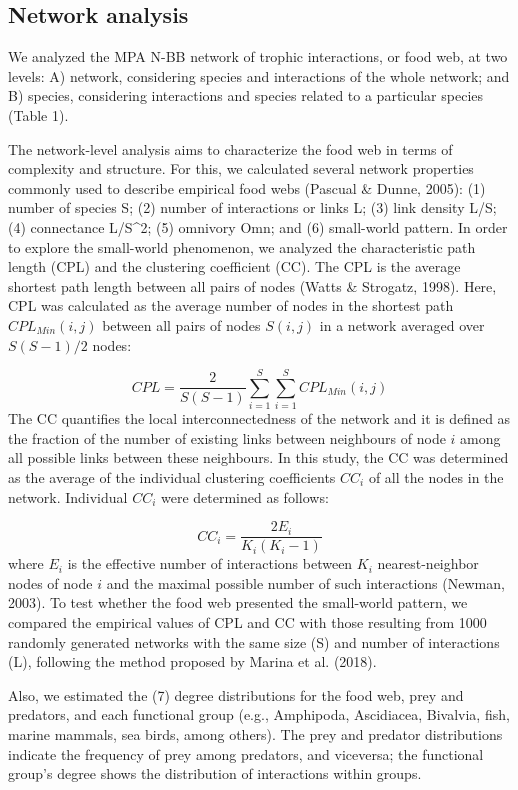 \documentclass[preprint, 3p,
authoryear]{elsarticle} %
\begin{document}
\hypertarget{network-analysis}{%
\subsection{Network analysis}\label{network-analysis}}

We analyzed the MPA N-BB network of trophic interactions, or food web,
at two levels: A) network, considering species and interactions of the
whole network; and B) species, considering interactions and species
related to a particular species (Table 1).

The network-level analysis aims to characterize the food web in terms of
complexity and structure. For this, we calculated several network
properties commonly used to describe empirical food webs (Pascual \&
Dunne, 2005): (1) number of species S; (2) number of interactions or
links L; (3) link density L/S; (4) connectance L/S\^{}2; (5) omnivory
Omn; and (6) small-world pattern. In order to explore the small-world
phenomenon, we analyzed the characteristic path length (CPL) and the
clustering coefficient (CC). The CPL is the average shortest path length
between all pairs of nodes (Watts \& Strogatz, 1998). Here, CPL was
calculated as the average number of nodes in the shortest path
\(CPL_{Min} (i,j)\) between all pairs of nodes \(S(i,j)\) in a network
averaged over \(S(S-1)/2\) nodes:

\[
CPL = \frac{2}{S(S-1)} \sum_{i = 1}^{S} \sum_{i = 1}^{S} {CPL_{Min}(i,j)}
\] The CC quantifies the local interconnectedness of the network and it
is defined as the fraction of the number of existing links between
neighbours of node \(i\) among all possible links between these
neighbours. In this study, the CC was determined as the average of the
individual clustering coefficients \(CC_i\) of all the nodes in the
network. Individual \(CC_i\) were determined as follows:

\[
CC_i = \frac{2E_i}{K_i(K_i-1)}
\] where \(E_i\) is the effective number of interactions between \(K_i\)
nearest-neighbor nodes of node \(i\) and the maximal possible number of
such interactions (Newman, 2003). To test whether the food web presented
the small-world pattern, we compared the empirical values of CPL and CC
with those resulting from 1000 randomly generated networks with the same
size (S) and number of interactions (L), following the method proposed
by Marina et al. (2018).

Also, we estimated the (7) degree distributions for the food web, prey
and predators, and each functional group (e.g., Amphipoda, Ascidiacea,
Bivalvia, fish, marine mammals, sea birds, among others). The prey and
predator distributions indicate the frequency of prey among predators,
and viceversa; the functional group's degree shows the distribution of
interactions within groups.
\end{document}
